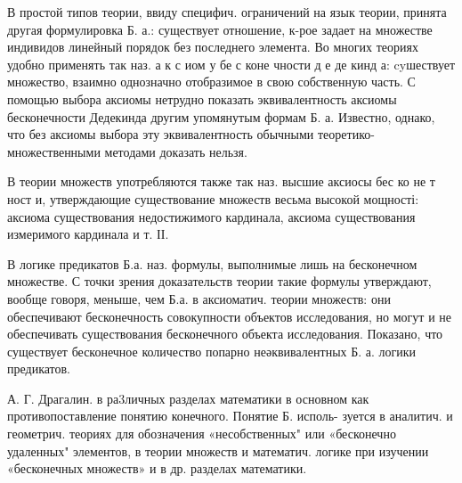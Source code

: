 \documentclass[10pt]{article}
\begin{document}
В простой типов теории, ввиду специфич. ограничений на язык теории, принята другая формулировка Б. а.: существует отношение, к-рое задает на множестве индивидов линейный порядок без последнего элемента. Во многих теориях удобно применять так наз. а к с иом у бе с коне чности д е де кинд а: cyшествует множество, взаимно однозначно отобразимое в свою собственную часть. С помощью выбора аксиомы нетрудно показать эквивалентность аксиомы бесконечности Дедекинда другим упомянутым формам Б. а. Известно, однако, что без аксиомы выбора эту эквивалентность обычными теоретико-множественными методами доказать нельзя.



В теории множеств употребляются также так наз. высшие аксиосы бес ко не т ност и, утверждающие существование множеств весьма высокой мощності: аксиома существования недостижимого кардинала, аксиома существования измеримого кардинала и т. ІІ.



В логике предикатов Б.а. наз. формулы, выполнимые лишь на бесконечном множестве. С точки зрения доказательств теории такие формулы утверждают, вообще говоря, меныше, чем Б.а. в аксиоматич. теории множеств: они обеспечивают бесконечность совокупности объектов исследования, но могут и не обеспечивать существования бесконечного объекта исследования. Показано, что существует бесконечное количество попарно неәквивалентных Б. а. логики предикатов.



А. Г. Драгалин. в ра3личных разделах математики в основном как противопоставление понятию конечного. Понятие Б. исполь- зуется в аналитич. и геометрич. теориях для обозначения «несобственных" или «бесконечно удаленных" элементов, в теории множеств и математич. логике при изучении «бесконечных множеств» и в др. разделах математики.
\end{document}
